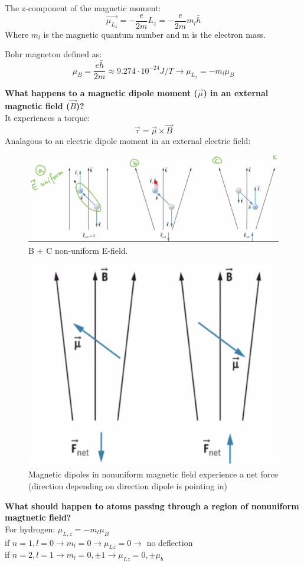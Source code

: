 \documentclass[class=article,crop=false]{standalone}
\begin{document}
The z-component of the magnetic moment:
$$ \vec{\mu_{L_z}} = -\frac{e}{2m} L_z = -\frac{e}{2m} m_l \bar{h} $$
Where $m_l$ is the magnetic quantum number and m is the electron mass.

Bohr magneton defined as:
$$ \mu_B = \frac{e\bar{h}}{2m} \approx 9.274 \cdot 10^{-24} J/T \rightarrow \mu_L_z = -m_l \mu_B $$

\textbf{What happens to a magnetic dipole moment ($\vec{\mu}$) in an external magnetic field ($\vec{B}$)? }\\
It experiences a torque:
$$ \vec{\tau} = \vec{\mu} \times \vec{B} $$
Analagous to an electric dipole moment in an external electric field:



\begin{figure}[h!]
	\centering
	\includegraphics[width=1\linewidth]{./Images/electric_dipole.png}
	\caption{B + C non-uniform E-field.}
\end{figure}


\begin{figure}[h!]
	\centering
	\includegraphics[width=.6\linewidth]{./Images/magnetic_dipole.png}
	\caption{Magnetic dipoles in nonuniform magnetic field experience a net force (direction depending on direction dipole is pointing in)}
\end{figure}

\newpage
\textbf{What should happen to atoms passing through a region of nonuniform magtnetic field?}\\
For hydrogen: $\mu_{L,z} = -m_l \mu_B$ \\
if $n=1, l = 0 \rightarrow m_l = 0 \rightarrow \mu_{Lz} = 0 \rightarrow$ no deflection\\
if $n=2, l = 1 \rightarrow m_l = 0, \pm 1 \rightarrow \mu_{Lz} = 0, \pm \mu_{b} $ \\
\end{document}
